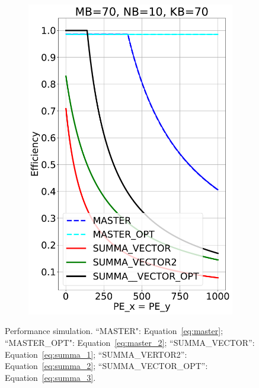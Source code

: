 \begin{figure}[t!]
\begin{subfigure}{0.32\columnwidth}
    \includegraphics[width=\linewidth]{figures/efficiency_cost_70_10_70.pdf}
  \end{subfigure}
  \caption{Performance simulation. ``MASTER": Equation~\ref{eq:master}; ``MASTER\_OPT": Equation~\ref{eq:master_2}; ``SUMMA\_VECTOR'': Equation~\ref{eq:summa_1}; ``SUMMA\_VERTOR2'': Equation~\ref{eq:summa_2}; ``SUMMA\_VECTOR\_OPT'': Equation~\ref{eq:summa_3}.}
  \label{fig:gemm_perf_simulate}
\end{figure}


